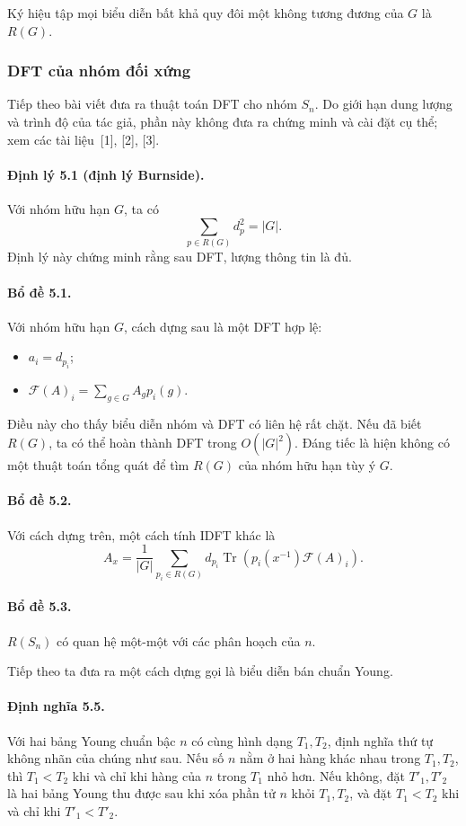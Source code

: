 \documentclass[11pt]{article}
\begin{document}
Ký hiệu tập mọi biểu diễn bất khả quy đôi một không tương đương của $G$ là
$R(G)$.

\subsubsection{DFT của nhóm đối xứng}

Tiếp theo bài viết đưa ra thuật toán DFT cho nhóm $S_n$. Do giới hạn dung lượng
và trình độ của tác giả, phần này không đưa ra chứng minh và cài đặt cụ thể;
xem các tài liệu~[1], [2], [3].

\paragraph{Định lý 5.1 (định lý Burnside).}
Với nhóm hữu hạn $G$, ta có
\[
  \sum_{p\in R(G)} d_p^2=|G|.
\]
Định lý này chứng minh rằng sau DFT, lượng thông tin là đủ.

\paragraph{Bổ đề 5.1.}
Với nhóm hữu hạn $G$, cách dựng sau là một DFT hợp lệ:
\begin{itemize}
  \item $a_i=d_{p_i}$;
  \item $\mathcal F(A)_i=\sum_{g\in G} A_g p_i(g)$.
\end{itemize}
Điều này cho thấy biểu diễn nhóm và DFT có liên hệ rất chặt. Nếu đã biết
$R(G)$, ta có thể hoàn thành DFT trong $O(|G|^2)$. Đáng tiếc là hiện không có
một thuật toán tổng quát để tìm $R(G)$ của nhóm hữu hạn tùy ý $G$.

\paragraph{Bổ đề 5.2.}
Với cách dựng trên, một cách tính IDFT khác là
\[
  A_x=\frac{1}{|G|}\sum_{p_i\in R(G)}
  d_{p_i}\operatorname{Tr}\!\left(p_i(x^{-1})\mathcal F(A)_i\right).
\]

\paragraph{Bổ đề 5.3.}
$R(S_n)$ có quan hệ một-một với các phân hoạch của $n$.

Tiếp theo ta đưa ra một cách dựng gọi là biểu diễn bán chuẩn Young.

\paragraph{Định nghĩa 5.5.}
Với hai bảng Young chuẩn bậc $n$ có cùng hình dạng $T_1,T_2$, định nghĩa thứ tự
không nhãn của chúng như sau. Nếu số $n$ nằm ở hai hàng khác nhau trong
$T_1,T_2$, thì $T_1<T_2$ khi và chỉ khi hàng của $n$ trong $T_1$ nhỏ hơn. Nếu
không, đặt $T'_1,T'_2$ là hai bảng Young thu được sau khi xóa phần tử $n$ khỏi
$T_1,T_2$, và đặt $T_1<T_2$ khi và chỉ khi $T'_1<T'_2$.
\end{document}
